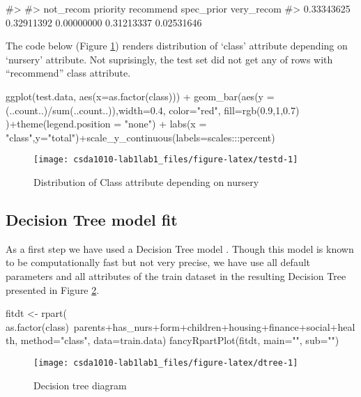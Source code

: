 \begin{Schunk}
\begin{Soutput}
#> 
#>  not_recom   priority  recommend spec_prior very_recom 
#> 0.33343625 0.32911392 0.00000000 0.31213337 0.02531646
\end{Soutput}
\end{Schunk}

The code below (Figure \ref{fig:testd}) renders distribution of `class'
attribute depending on `nursery' attribute. Not suprisingly, the test
set did not get any of rows with ``recommend'' class attribute.

\begin{Schunk}
\begin{Sinput}
ggplot(test.data, aes(x=as.factor(class))) + 
  geom_bar(aes(y = (..count..)/sum(..count..)),width=0.4,
  color="red", fill=rgb(0.9,1,0.7) )+theme(legend.position = "none") + 
  labs(x = "class",y="total")+scale_y_continuous(labels=scales:::percent)
\end{Sinput}
\begin{figure}[h]

{\centering \texttt{[image: csda1010-lab1lab1\_files/figure-latex/testd-1]} 

}

\caption[Distribution of Class attribute depending on nursery]{Distribution of Class attribute depending on nursery}\label{fig:testd}
\end{figure}
\end{Schunk}

\hypertarget{decision-tree-model-fit}{%
\subsection{Decision Tree model fit}\label{decision-tree-model-fit}}

As a first step we have used a Decision Tree model \citep{R-rpart}.
Though this model is known to be computationally fast but not very
precise, we have use all default parameters and all attributes of the
train dataset in the resulting Decision Tree presented in Figure
\ref{fig:dtree}.

\begin{Schunk}
\begin{Sinput}
fitdt <- rpart(
  as.factor(class)~parents+has_nurs+form+children+housing+finance+social+health,
  method="class", data=train.data)
fancyRpartPlot(fitdt, main="", sub="")
\end{Sinput}
\begin{figure}[h]

{\centering \texttt{[image: csda1010-lab1lab1\_files/figure-latex/dtree-1]} 

}

\caption[Decision tree diagram]{Decision tree diagram}\label{fig:dtree}
\end{figure}
\end{Schunk}

